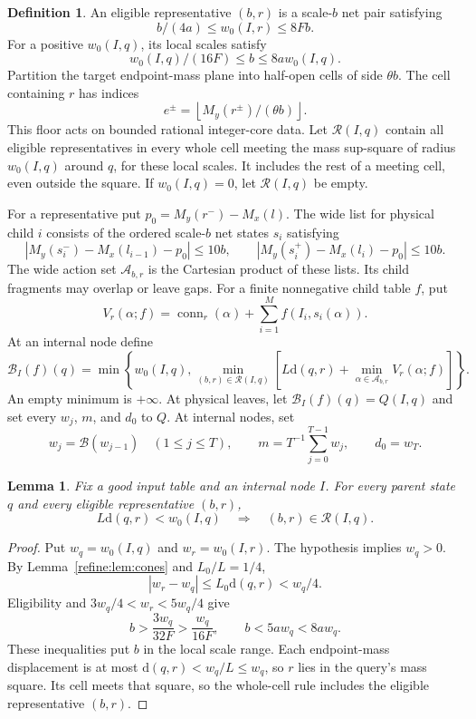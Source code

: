 \documentclass[11pt]{article}
\newtheorem{lemma}[theorem]{Lemma}
\theoremstyle{definition}
\newtheorem{definition}[theorem]{Definition}
\newcommand{\conn}{\operatorname{conn}}
\newcommand{\dd}{\mathrm d}
\newcommand{\cB}{\mathcal B}
\newcommand{\cA}{\mathcal A}
\newcommand{\1}{\mathbf 1}
\begin{document}
\begin{definition}\label{refine:def:local}
An eligible representative $(b,r)$ is a scale-$b$ net pair satisfying
\[
 b/(4a)\le w_0(I,r)\le8Fb.
\]
For a positive $w_0(I,q)$, its local scales satisfy
\[
 w_0(I,q)/(16F)\le b\le8a w_0(I,q).
\]
Partition the target endpoint-mass plane into half-open cells of side
$\theta b$. The cell containing $r$ has indices
\[
 e^\pm=\left\lfloor M_y(r^\pm)/(\theta b)\right\rfloor.
\]
This floor acts on bounded rational integer-core data. Let
$\mathcal R(I,q)$ contain all eligible representatives in every whole
cell meeting the mass sup-square of radius $w_0(I,q)$ around $q$, for
these local scales. It includes the rest of a meeting cell, even outside
the square. If $w_0(I,q)=0$, let $\mathcal R(I,q)$ be empty.

For a representative put $p_0=M_y(r^-)-M_x(l)$. The wide list for
physical child $i$ consists of the ordered scale-$b$ net states $s_i$
satisfying
\[
 |M_y(s_i^-)-M_x(l_{i-1})-p_0|\le10b,
 \qquad |M_y(s_i^+)-M_x(l_i)-p_0|\le10b.
\]
The wide action set $\cA_{b,r}$ is the Cartesian product of these lists.
Its child fragments may overlap or leave gaps. For a finite nonnegative child table $f$,
put
\[
 V_r(\alpha;f)=\conn_r(\alpha)+\sum_{i=1}^M f(I_i,s_i(\alpha)).
\]
At an internal node define
\[
 \cB_I(f)(q)=\min\left\{w_0(I,q),
 \min_{(b,r)\in\mathcal R(I,q)}
 \left[L\dd(q,r)+\min_{\alpha\in\cA_{b,r}}V_r(\alpha;f)\right]\right\}.
\]
An empty minimum is $+\infty$. At physical leaves, let $\cB_I(f)(q)=Q(I,q)$ and set every $w_j$, $m$,
and $d_0$ to $Q$. At internal nodes, set
\[
 w_j=\cB(w_{j-1})\quad(1\le j\le T),\qquad
 m=T^{-1}\sum_{j=0}^{T-1}w_j,\qquad d_0=w_T.
\]
\end{definition}

\begin{lemma}\label{refine:lem:localization}
Fix a good input table and an internal node $I$. For every parent state
$q$ and every eligible representative $(b,r)$,
\[
 L\dd(q,r)<w_0(I,q)\quad\Longrightarrow\quad
 (b,r)\in\mathcal R(I,q).
\]
\end{lemma}
\begin{proof}
Put $w_q=w_0(I,q)$ and $w_r=w_0(I,r)$. The hypothesis implies $w_q>0$.
By Lemma~\ref{refine:lem:cones} and $L_0/L=1/4$,
\[
 |w_r-w_q|\le L_0\dd(q,r)<w_q/4.
\]
Eligibility and $3w_q/4<w_r<5w_q/4$ give
\[
 b>\frac{3w_q}{32F}>\frac{w_q}{16F},\qquad
 b<5aw_q<8aw_q.
\]
These inequalities put $b$ in the local scale range. Each endpoint-mass
displacement is at most $\dd(q,r)<w_q/L\le w_q$, so $r$ lies in the
query's mass square. Its cell meets that square, so the whole-cell rule
includes the eligible representative $(b,r)$.
\end{proof}
\end{document}
